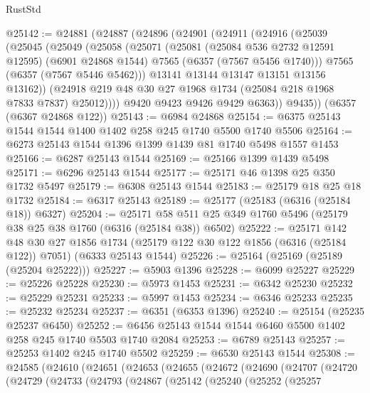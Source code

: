 \begin{lexlean}{RustStd}
\begin{coremodule}
@25142 := @24881
    (@24887
      (@24896
        (@24901
          (@24911
            (@24916
              (@25039
                (@25045
                  (@25049
                    (@25058
                      (@25071
                        (@25081
                          (@25084 @536 @2732 @12591 @12595)
                          (@6901 @24868 @1544)
                          @7565
                          (@6357 (@7567 @5456 @1740)))
                        @7565
                        (@6357 (@7567 @5446 @5462)))
                      @13141
                      @13144
                      @13147
                      @13151
                      @13156
                      @13162))
                  (@24918 @219 @48 @30 @27 @1968 @1734 (@25084 @218 @1968 @7833 @7837) @25012))))
            @9420
            @9423
            @9426
            @9429
            @6363))
        @9435))
    (@6357 (@6367 @24868 @122))
@25143 := @6984 @24868
@25154 := @6375 @25143 @1544 @1544 @1400 @1402 @258 @245 @1740 @5500 @1740 @5506
@25164 := @6273 @25143 @1544 @1396 @1399 @1439 @81 @1740 @5498 @1557 @1453
@25166 := @6287 @25143 @1544
@25169 := @25166 @1399 @1439 @5498
@25171 := @6296 @25143 @1544
@25177 := @25171 @46 @1398 @25 @350 @1732 @5497
@25179 := @6308 @25143 @1544
@25183 := @25179 @18 @25 @18 @1732
@25184 := @6317 @25143
@25189 := @25177 (@25183 (@6316 (@25184 @18)) @6327)
@25204 := @25171 @58 @511 @25 @349 @1760 @5496 (@25179 @38 @25 @38 @1760 (@6316 (@25184 @38)) @6502)
@25222 := @25171
    @142
    @48
    @30
    @27
    @1856
    @1734
    (@25179 @122 @30 @122 @1856 (@6316 (@25184 @122)) @7051)
    (@6333 @25143 @1544)
@25226 := @25164 (@25169 (@25189 (@25204 @25222)))
@25227 := @5903 @1396
@25228 := @6099 @25227
@25229 := @25226 @25228
@25230 := @5973 @1453
@25231 := @6342 @25230
@25232 := @25229 @25231
@25233 := @5997 @1453
@25234 := @6346 @25233
@25235 := @25232 @25234
@25237 := @6351 (@6353 @1396)
@25240 := @25154 (@25235 @25237 @6450)
@25252 := @6456 @25143 @1544 @1544 @6460 @5500 @1402 @258 @245 @1740 @5503 @1740 @2084
@25253 := @6789 @25143
@25257 := @25253 @1402 @245 @1740 @5502
@25259 := @6530 @25143 @1544
@25308 := @24585
    (@24610
      (@24651
        (@24653
          (@24655
            (@24672
              (@24690
                (@24707
                  (@24720
                    (@24729
                      (@24733
                        (@24793
                          (@24867
                            (@25142
                              (@25240
                                (@25252
                                  (@25257

\end{coremodule}
\end{lexlean}
